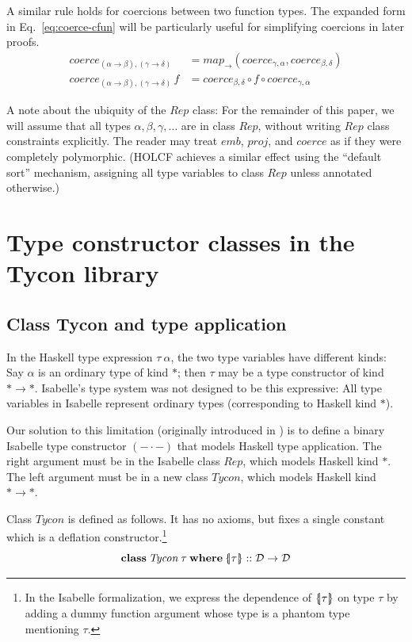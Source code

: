 \documentclass{sigplanconf}
\newcommand{\D}{\ensuremath{\mathcal{D}}}
\newcommand{\symlbrace}{\mathopen{\lbrace\mkern-4.5mu\mid}}
\newcommand{\symrbrace}{\mathclose{\mid\mkern-4.5mu\rbrace}}
\newcommand{\TC}[1]{\ensuremath{\symlbrace#1\symrbrace}}
\newcommand{\kwd}[1]{\mathbf{#1}}
\newcommand{\hsc}[1]{\ensuremath{\mathit{#1}}}
\newcommand{\hsRep}{\hsc{Rep}}
\newcommand{\hscoerce}{\hsc{coerce}}
\newcommand{\mapFun}{\hsc{map_\to}}
\newcommand{\tA}{\alpha}
\newcommand{\tB}{\beta}
\newcommand{\tC}{\gamma}
\newcommand{\tD}{\delta}
\newcommand{\tT}{\tau}
\theoremstyle{definition}
\begin{document}
A similar rule holds for coercions between two function types. The expanded form in Eq.~\eqref{eq:coerce-cfun} will be particularly useful for simplifying coercions in later proofs.
%
\begin{align}
\hscoerce_{(\tA\to\tB),(\tC\to\tD)} &= \mapFun(\hscoerce_{\tC,\tA}, \hscoerce_{\tB,\tD}) \\
\label{eq:coerce-cfun}
\hscoerce_{(\tA\to\tB),(\tC\to\tD)}\,f &= \hscoerce_{\tB,\tD} \circ f \circ \hscoerce_{\tC,\tA}
\end{align}

A note about the ubiquity of the \hsc{Rep} class: For the remainder of this paper, we will assume that all types $\tA, \tB, \tC, \dots$ are in class \hsc{Rep}, without writing \hsc{Rep} class constraints explicitly. The reader may treat \hsc{emb}, \hsc{proj}, and \hsc{coerce} as if they were completely polymorphic. (HOLCF achieves a similar effect using the ``default sort'' mechanism, assigning all type variables to class \hsc{Rep} unless annotated otherwise.)

\section{Type constructor classes in the Tycon library}
\label{sec:constructor-classes}


\subsection{Class Tycon and type application}
\label{sec:tycon}

In the Haskell type expression $\tT\:\tA$, the two type variables have different kinds: Say $\tA$ is an ordinary type of kind $*$; then $\tT$ may be a type constructor of kind $*\to*$. Isabelle's type system was not designed to be this expressive: All type variables in Isabelle represent ordinary types (corresponding to Haskell kind $*$).

Our solution to this limitation (originally introduced in \cite{HMW2005}) is to define a binary Isabelle type constructor $(-\cdot-)$ that models Haskell type application. The right argument must be in the Isabelle class $\hsRep$, which models Haskell kind $*$. The left argument must be in a new class \hsc{Tycon}, which models Haskell kind $*\to*$.

Class \hsc{Tycon} is defined as follows. It has no axioms, but fixes a single constant which is a deflation constructor.\footnote{In the Isabelle formalization, we express the dependence of $\TC{\tT}$ on type $\tT$ by adding a dummy function argument whose type is a phantom type mentioning $\tT$.}
%
\begin{equation*}
\kwd{class}\:\hsc{Tycon}\:\tT\:\kwd{where}\:\TC{\tT} :: \D \to \D
\end{equation*}
\end{document}
